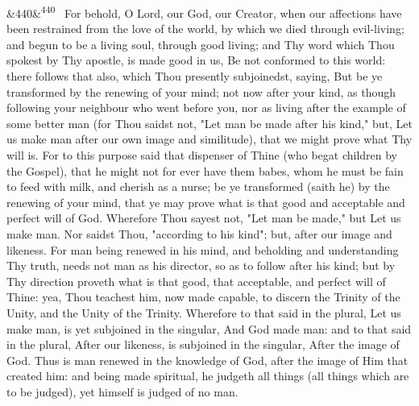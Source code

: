 \documentclass[12pt]{article}
\newcommand{\para}[1][]{\par\noindent\ifx&#1&\else\textsuperscript{\footnotesize #1}~\fi}
\begin{document}
\para[440] For behold, O Lord, our God, our Creator, when our affections have been restrained from the love of the world, by which we died through evil-living; and begun to be a living soul, through good living; and Thy word which Thou spokest by Thy apostle, is made good in us, Be not conformed to this world: there follows that also, which Thou presently subjoinedst, saying, But be ye transformed by the renewing of your mind; not now after your kind, as though following your neighbour who went before you, nor as living after the example of some better man (for Thou saidst not, "Let man be made after his kind," but, Let us make man after our own image and similitude), that we might prove what Thy will is. For to this purpose said that dispenser of Thine (who begat children by the Gospel), that he might not for ever have them babes, whom he must be fain to feed with milk, and cherish as a nurse; be ye transformed (saith he) by the renewing of your mind, that ye may prove what is that good and acceptable and perfect will of God. Wherefore Thou sayest not, "Let man be made," but Let us make man. Nor saidst Thou, "according to his kind"; but, after our image and likeness. For man being renewed in his mind, and beholding and understanding Thy truth, needs not man as his director, so as to follow after his kind; but by Thy direction proveth what is that good, that acceptable, and perfect will of Thine: yea, Thou teachest him, now made capable, to discern the Trinity of the Unity, and the Unity of the Trinity. Wherefore to that said in the plural, Let us make man, is yet subjoined in the singular, And God made man: and to that said in the plural, After our likeness, is subjoined in the singular, After the image of God. Thus is man renewed in the knowledge of God, after the image of Him that created him: and being made spiritual, he judgeth all things (all things which are to be judged), yet himself is judged of no man.
\end{document}
